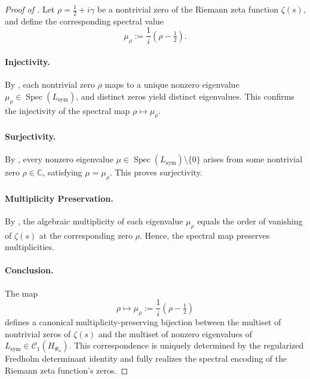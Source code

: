 \begin{proof}[Proof of ]
Let \( \rho = \tfrac{1}{2} + i\gamma \) be a nontrivial zero of the Riemann zeta function \( \zeta(s) \), and define the corresponding spectral value
\[
\mu_\rho := \frac{1}{i}(\rho - \tfrac{1}{2}).
\]

\paragraph{Injectivity.}
By , each nontrivial zero \( \rho \) maps to a unique nonzero eigenvalue \( \mu_\rho \in \operatorname{Spec}(L_{\mathrm{sym}}) \), and distinct zeros yield distinct eigenvalues. This confirms the injectivity of the spectral map \( \rho \mapsto \mu_\rho \).

\paragraph{Surjectivity.}
By , every nonzero eigenvalue \( \mu \in \operatorname{Spec}(L_{\mathrm{sym}}) \setminus \{0\} \) arises from some nontrivial zero \( \rho \in \mathbb{C} \), satisfying \( \mu = \mu_\rho \). This proves surjectivity.

\paragraph{Multiplicity Preservation.}
By , the algebraic multiplicity of each eigenvalue \( \mu_\rho \) equals the order of vanishing of \( \zeta(s) \) at the corresponding zero \( \rho \). Hence, the spectral map preserves multiplicities.

\paragraph{Conclusion.}
The map
\[
\rho \longmapsto \mu_\rho := \frac{1}{i}(\rho - \tfrac{1}{2})
\]
defines a canonical multiplicity-preserving bijection between the multiset of nontrivial zeros of \( \zeta(s) \) and the multiset of nonzero eigenvalues of \( L_{\mathrm{sym}} \in \mathcal{C}_1(H_{\Psi_\alpha}) \). This correspondence is uniquely determined by the regularized Fredholm determinant identity and fully realizes the spectral encoding of the Riemann zeta function's zeros.
\end{proof}
